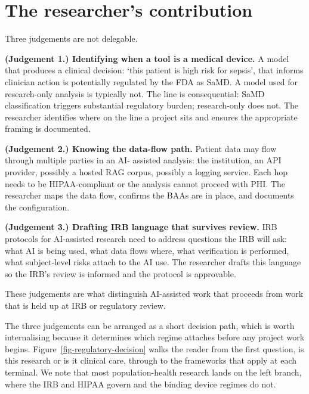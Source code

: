 \documentclass[
  letterpaper,
  11pt]{scrbook}
\begin{document}
\section{The researcher's contribution}\label{sec-regulation-irb-human}

Three judgements are not delegable.

\textbf{(Judgement 1.) Identifying when a tool is a medical device.} A
model that produces a clinical decision: `this patient is high risk for
sepsis', that informs clinician action is potentially regulated by the
FDA as SaMD. A model used for research-only analysis is typically not.
The line is consequential: SaMD classification triggers substantial
regulatory burden; research-only does not. The researcher identifies
where on the line a project sits and ensures the appropriate framing is
documented.

\textbf{(Judgement 2.) Knowing the data-flow path.} Patient data may
flow through multiple parties in an AI- assisted analysis: the
institution, an API provider, possibly a hosted RAG corpus, possibly a
logging service. Each hop needs to be HIPAA-compliant or the analysis
cannot proceed with PHI. The researcher maps the data flow, confirms the
BAAs are in place, and documents the configuration.

\textbf{(Judgement 3.) Drafting IRB language that survives review.} IRB
protocols for AI-assisted research need to address questions the IRB
will ask: what AI is being used, what data flows where, what
verification is performed, what subject-level risks attach to the AI
use. The researcher drafts this language so the IRB's review is informed
and the protocol is approvable.

These judgements are what distinguish AI-assisted work that proceeds
from work that is held up at IRB or regulatory review.

The three judgements can be arranged as a short decision path, which is
worth internalising because it determines which regime attaches before
any project work begins. Figure~\ref{fig-regulatory-decision} walks the
reader from the first question, is this research or is it clinical care,
through to the frameworks that apply at each terminal. We note that most
population-health research lands on the left branch, where the IRB and
HIPAA govern and the binding device regimes do not.
\end{document}
